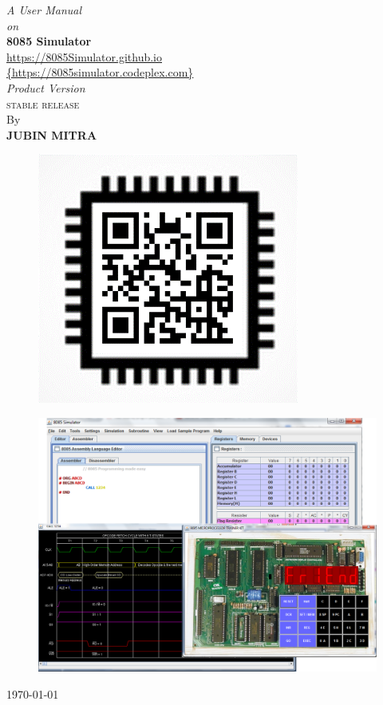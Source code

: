 \thispagestyle{empty}

\begin{center}
\vspace{0.03\textheight}
\textit{A User Manual\\}
\vspace{0.01\textheight}
\textit{on\\}
\vspace{0.03\textheight}
{\Huge\textbf{8085 Simulator
}}\\
{\url{https://8085Simulator.github.io}}\\
{\url{{https://8085simulator.codeplex.com}}}\\


\vspace{0.015\textheight}
\textit{Product Version \ver}\\
\textsc{stable release}
\vspace{0.015\textheight}
\\By\\
\textbf{\textsc{JUBIN MITRA}}\\
\begin{figure}[htbp]
	\centering
	\includegraphics[width=0.2\linewidth]{qr_code}
\end{figure} 
\vspace{0.02\textheight}
\begin{figure}[H]
\centering

\includegraphics[width=\linewidth]{"./top_page1"}
\end{figure}
\today
\end{center}


